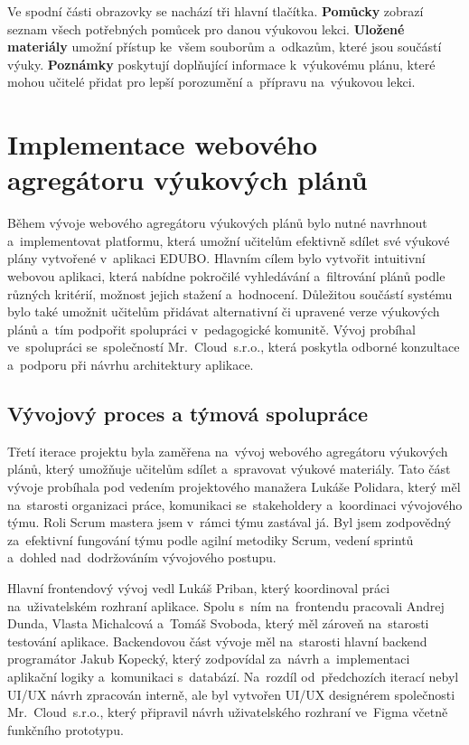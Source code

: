 \documentclass[male,czech,api_bc]{kitheses}
\begin{document}
Ve spodní části obrazovky se nachází tři hlavní tlačítka. \textbf{Pomůcky} zobrazí seznam všech potřebných pomůcek pro danou výukovou lekci. \textbf{Uložené materiály} umožní přístup ke~všem souborům a~odkazům, které jsou součástí výuky. \textbf{Poznámky} poskytují doplňující informace k~výukovému plánu, které mohou učitelé přidat pro lepší porozumění a~přípravu na~výukovou lekci.


\section{Implementace webového agregátoru výukových plánů}

Během vývoje webového agregátoru výukových plánů bylo nutné navrhnout a~implementovat platformu, která umožní učitelům efektivně sdílet své výukové plány vytvořené v~aplikaci EDUBO. Hlavním cílem bylo vytvořit intuitivní webovou aplikaci, která nabídne pokročilé vyhledávání a~filtrování plánů podle různých kritérií, možnost jejich stažení a~hodnocení. Důležitou součástí systému bylo také umožnit učitelům přidávat alternativní či upravené verze výukových plánů a~tím podpořit spolupráci v~pedagogické komunitě. Vývoj probíhal ve~spolupráci se~společností Mr.~Cloud~s.r.o., která poskytla odborné konzultace a~podporu při návrhu architektury aplikace.

\subsection{Vývojový proces a týmová spolupráce}

Třetí iterace projektu byla zaměřena na~vývoj webového agregátoru výukových plánů, který umožňuje učitelům sdílet a~spravovat výukové materiály. Tato část vývoje probíhala pod vedením projektového manažera Lukáše Polidara, který měl na~starosti organizaci práce, komunikaci se~stakeholdery a~koordinaci vývojového týmu. Roli Scrum mastera jsem v~rámci týmu zastával já. Byl jsem zodpovědný za~efektivní fungování týmu podle agilní metodiky Scrum, vedení sprintů a~dohled nad~dodržováním vývojového postupu.

Hlavní frontendový vývoj vedl Lukáš Priban, který koordinoval práci na~uživatelském rozhraní aplikace. Spolu s~ním na~frontendu pracovali Andrej Dunda, Vlasta Michalcová a~Tomáš Svoboda, který měl zároveň na~starosti testování aplikace. Backendovou část vývoje měl na~starosti hlavní backend programátor Jakub Kopecký, který zodpovídal za~návrh a~implementaci aplikační logiky a~komunikaci s~databází. Na~rozdíl od~předchozích iterací nebyl UI/UX návrh zpracován interně, ale byl vytvořen UI/UX designérem společnosti Mr.~Cloud~s.r.o., který připravil návrh uživatelského rozhraní ve~Figma včetně funkčního prototypu.
\end{document}
